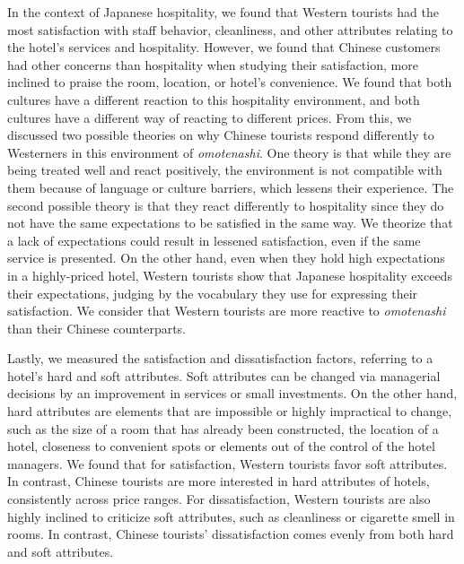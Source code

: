 \documentclass[smallextended,natbib]{svjour3}       %
\begin{document}
  In the context of Japanese hospitality, we found that Western tourists had the most satisfaction with staff behavior, cleanliness, and other attributes relating to the hotel's services and hospitality. However, we found that Chinese customers had other concerns than hospitality when studying their satisfaction, more inclined to praise the room, location, or hotel's convenience. We found that both cultures have a different reaction to this hospitality environment, and both cultures have a different way of reacting to different prices. From this, we discussed two possible theories on why Chinese tourists respond differently to Westerners in this environment of \textit{omotenashi}. One theory is that while they are being treated well and react positively, the environment is not compatible with them because of language or culture barriers, which lessens their experience. The second possible theory is that they react differently to hospitality since they do not have the same expectations to be satisfied in the same way. We theorize that a lack of expectations could result in lessened satisfaction, even if the same service is presented. On the other hand, even when they hold high expectations in a highly-priced hotel, Western tourists show that Japanese hospitality exceeds their expectations, judging by the vocabulary they use for expressing their satisfaction. We consider that Western tourists are more reactive to \textit{omotenashi} than their Chinese counterparts.

  Lastly, we measured the satisfaction and dissatisfaction factors, referring to a hotel's hard and soft attributes. Soft attributes can be changed via managerial decisions by an improvement in services or small investments. On the other hand, hard attributes are elements that are impossible or highly impractical to change, such as the size of a room that has already been constructed, the location of a hotel, closeness to convenient spots or elements out of the control of the hotel managers. We found that for satisfaction, Western tourists favor soft attributes. In contrast, Chinese tourists are more interested in hard attributes of hotels, consistently across price ranges. For dissatisfaction, Western tourists are also highly inclined to criticize soft attributes, such as cleanliness or cigarette smell in rooms. In contrast, Chinese tourists' dissatisfaction comes evenly from both hard and soft attributes.
\end{document}
